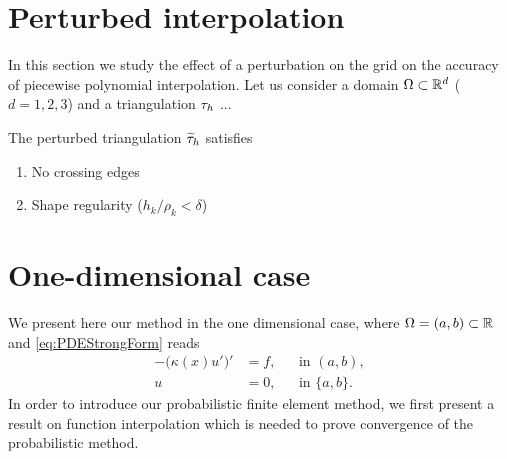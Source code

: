 \documentclass[10pt]{article}
\begin{document}
\section{Perturbed interpolation} In this section we study the effect of a perturbation on the grid on the accuracy of piecewise polynomial interpolation. Let us consider a domain $\Omega \subset \mathbb{R}^d$ ($d = 1, 2, 3$) and a triangulation $\tau_h$ ...

\begin{assumption} The perturbed triangulation $\widetilde {\tau}_h$ satisfies 
	\begin{enumerate}
		\item No crossing edges
		\item Shape regularity ($h_k / \rho_k < \delta$)
	\end{enumerate}
	
\end{assumption}





\section{One-dimensional case} We present here our method in the one dimensional case, where $\Omega = (a, b) \subset \mathbb{R}$ and \eqref{eq:PDEStrongForm} reads
\begin{equation}\label{eq:PDEStrongForm1d}
\begin{aligned}
	-\big(\kappa(x)u'\big)' &= f, && \text{in } (a, b),\\
	u &= 0, && \text{in } \{a, b\}.
\end{aligned}
\end{equation}	
In order to introduce our probabilistic finite element method, we first present a result on function interpolation which is needed to prove convergence of the probabilistic method.
\end{document}
